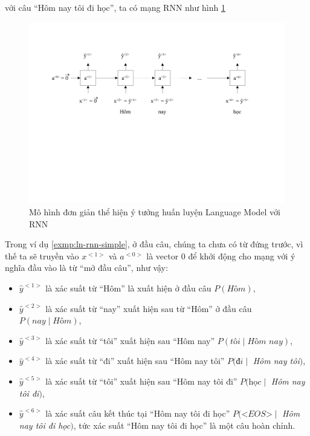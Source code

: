\begin{exmp}
\label{exmp:ln-rnn-simple}
với câu “Hôm nay tôi đi học”, ta có mạng RNN như hình \ref{fig:lm-rnn-simple}
\begin{figure}[h!]
    \centering
    \includegraphics[width=13cm]{books/artificial-neural-network/chapter07/figure-sec12/lm-rnn-simple.pdf}
    \caption{Mô hình đơn giản thể hiện ý tưởng huấn luyện Language Model với RNN}
    \label{fig:lm-rnn-simple}
\end{figure}
\end{exmp}
Trong ví dụ \ref{exmp:ln-rnn-simple}, ở đầu câu, chúng ta chưa có từ đứng trước, vì thế ta sẽ truyền vào $x^{<1>}$ và $a^{<0>}$ là vector 0 để khởi động cho mạng với ý nghĩa đầu vào là từ “mở đầu câu”, như vậy:

\begin{itemize}
\item $\hat{y}^{<1>}$ là xác suất từ “Hôm” là xuất hiện ở đầu câu $P(\textit{Hôm})$,
\item $\hat{y}^{<2>}$ là xác suất từ “nay” xuất hiện sau từ “Hôm” ở đầu câu $P(\textit{nay} \mid \textit{Hôm})$,
\item $\hat{y}^{<3>}$ là xác suất từ “tôi” xuất hiện sau “Hôm nay” $P(\textit{tôi} \mid \textit{Hôm nay})$,
\item $\hat{y}^{<4>}$ là xác suất từ “đi” xuất hiện sau “Hôm nay tôi” $P(\textit{đi} \mid$ \textit{Hôm nay tôi}$)$,
\item $\hat{y}^{<5>}$ là xác suất từ “tôi” xuất hiện sau “Hôm nay tôi đi” $P(\textit{học} \mid$ \textit{Hôm nay tôi đi}$)$,
\item $\hat{y}^{<6>}$ là xác suất câu kết thúc tại “Hôm nay tôi đi học” $P(\textit{<EOS>} \mid$ \textit{Hôm nay tôi đi học}$)$, tức xác suất “Hôm nay tôi đi học” là một câu hoàn chỉnh.
\end{itemize}

